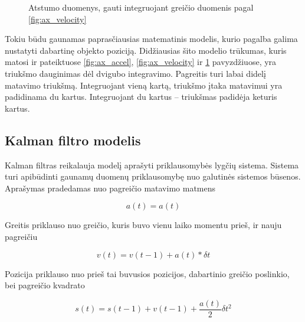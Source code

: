\begin{figure}
    \centering
    \caption{Atstumo duomenys, gauti integruojant greičio duomenis pagal \ref{fig:ax_velocity}}
    \label{fig:ax_distance}
\end{figure}

Tokiu būdu gaunamas paprasčiausias matematinis modelis, kurio pagalba galima nustatyti dabartinę objekto poziciją.
Didžiausias šito modelio trūkumas, kuris matosi ir pateiktuose \ref{fig:ax_accel}, \ref{fig:ax_velocity} ir \ref{fig:ax_distance} pavyzdžiuose, yra triukšmo dauginimas dėl dvigubo integravimo.
Pagreitis turi labai didelį matavimo triukšmą.
Integruojant vieną kartą, triukšmo įtaka matavimui yra padidinama du kartus.
Integruojant du kartus -- triukšmas padidėja keturis kartus.

\subsection{Kalman filtro modelis}

Kalman filtras reikalauja modelį aprašyti priklausomybės lygčių sistema.
Sistema turi apibūdinti gaunamų duomenų priklausomybę nuo galutinės sistemos būsenos.
Aprašymas pradedamas nuo pagreičio matavimo matmens

\begin{equation}
    a(t) = a(t)
\end{equation}

Greitis priklauso nuo greičio, kuris buvo vienu laiko momentu prieš, ir nauju pagreičiu

\begin{equation}
    v(t) = v(t-1) + a(t) * \delta t
\end{equation}

Pozicija priklauso nuo prieš tai buvusios pozicijos, dabartinio greičio poslinkio, bei pagreičio kvadrato

\begin{equation}
    s(t) = s(t-1) + v(t-1) + \frac{a(t)}{2}\delta t^2
\end{equation}

